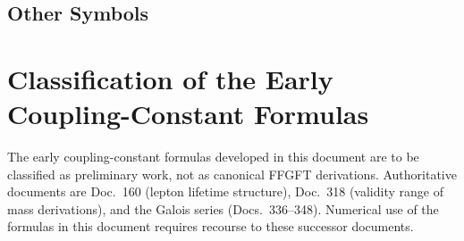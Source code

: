 \subsection{Other Symbols}
\normalsize	
\appendix


\section*{Classification of the Early Coupling-Constant Formulas}

The early coupling-constant formulas developed in this document are to be
classified as preliminary work, not as canonical FFGFT derivations.
Authoritative documents are Doc.~160 (lepton lifetime structure),
Doc.~318 (validity range of mass derivations), and the Galois series
(Docs.~336--348). Numerical use of the formulas in this document requires
recourse to these successor documents.
